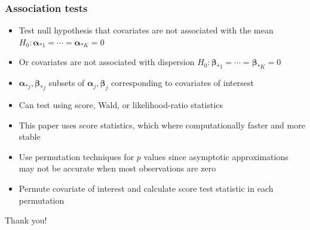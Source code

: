 \documentclass{beamer}
\begin{document}
\begin{frame}
\frametitle{Association tests}
\begin{itemize}
  \item Test null hypothesis that covariates are not associated with the mean
$H_0: \bm{\alpha}_{*1} = \cdots = \bm{\alpha}_{*K} = 0$
\item Or covariates are not associated with dispersion
$H_0: \bm{\beta}_{*1} = \cdots = \bm{\beta}_{*K} = 0$
\item $\bm\alpha_{*j},\bm\beta_{*j}$ subsets of $\bm \alpha_j, \bm\beta_j$ corresponding to covariates of intersest

  \item Can test using score, Wald, or likelihood-ratio statistics
  \item This paper uses score statistics, which where computationally faster and more stable
  \item Use permutation techniques for $p$ values since asymptotic approximations may not be accurate when most observations are zero 
  \item Permute covariate of interest and calculate score test statistic in each permutation
\end{itemize}
\end{frame}

\begin{frame}
\Huge{\centerline{Thank you!}}
\end{frame}

  
\end{document}
